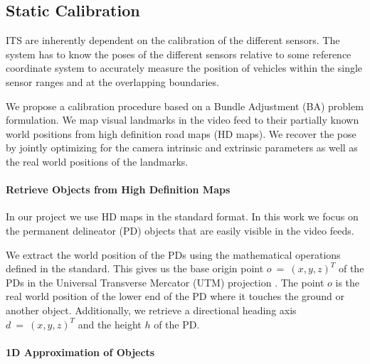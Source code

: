 
\subsection{Static Calibration}
\label{sec:static_calibration_approach}

ITS are inherently dependent on the calibration of the different sensors. 
The system has to know the poses of the different sensors relative to some reference coordinate system to accurately measure the position of vehicles within the single sensor ranges and at the overlapping boundaries.

We propose a calibration procedure based on a Bundle Adjustment (BA) problem formulation.
We map visual landmarks in the video feed to their partially known world positions from high definition road maps (HD maps).
We recover the pose by jointly optimizing for the camera intrinsic and extrinsic parameters as well as the real world positions of the landmarks. 


\paragraph{Retrieve Objects from High Definition Maps}

In our project we use HD maps in the \OD{} standard format.
In this work we focus on the permanent delineator (PD) objects that are easily visible in the video feeds.

We extract the world position of the PDs using the mathematical operations defined in the \OD{} standard.
This gives us the base origin point $o~=~(x, y, z)^T$ of the PDs in the Universal Transverse Mercator (UTM) projection \cite{langley1998utm,proj}. 
The point $o$ is the real world position of the lower end of the PD where it touches the ground or another object.
Additionally, we retrieve a directional heading axis $d~=~(x, y, z)^T$ and the height $h$ of the PD.

\paragraph{1D Approximation of Objects}

